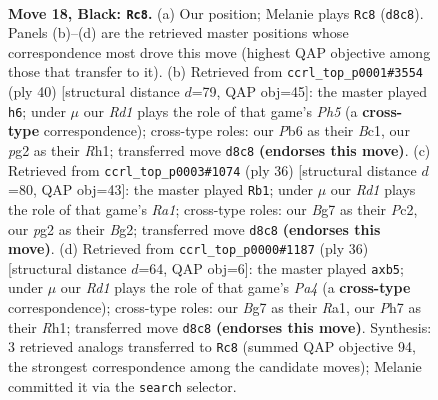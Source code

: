 \documentclass[11pt]{article}
\begin{document}
\begin{figure}[p]
\label{fig:thought-m33}
\end{figure}

\clearpage

\begin{figure}[p]\centering
\begin{subfigure}{0.46\textwidth}\centering
\resizebox{\linewidth}{!}{%
\newchessgame
\chessboard[
  setfen={rn1rn1k1/p4pbp/Pp2b3/1P2p2R/4P3/2N2N2/4BPP1/R1B1K3 b Q - 0 18},
  showmover=false,
  pgfstyle=straightmove, color=movearrow, markmove={d8-c8}
]}
\caption{}
\end{subfigure}\hfill
\begin{subfigure}{0.46\textwidth}\centering
\resizebox{\linewidth}{!}{%
\newchessgame
\chessboard[
  setfen={r2n2r1/p2kn3/1p3p2/1N1ppb1P/P7/5P2/1RP3P1/2B1KB1R w K - 1 21},
  showmover=false,
  pgfstyle=straightmove, color=movearrow, markmove={h5-h6}
]}
\caption{}
\end{subfigure}
\\[4pt]
\begin{subfigure}{0.46\textwidth}\centering
\resizebox{\linewidth}{!}{%
\newchessgame
\chessboard[
  setfen={2rnkbr1/1p3p1p/p3bp2/N3p3/P7/2P2RP1/2P2PBP/R1B3K1 w - - 4 19},
  showmover=false,
  pgfstyle=straightmove, color=movearrow, markmove={a1-b1}
]}
\caption{}
\end{subfigure}\hfill
\begin{subfigure}{0.46\textwidth}\centering
\resizebox{\linewidth}{!}{%
\newchessgame
\chessboard[
  setfen={rnb3k1/p2p2p1/1n2p2p/1p2p3/P3P2P/5rP1/1P2NB2/R3KB1R w KQ - 0 19},
  showmover=false,
  pgfstyle=straightmove, color=movearrow, markmove={a4-b5}
]}
\caption{}
\end{subfigure}
\caption{\textbf{Move 18, Black: \texttt{Rc8}.} (a) Our position; Melanie plays \texttt{Rc8} (\texttt{d8c8}). Panels (b)--(d) are the retrieved master positions whose correspondence most drove this move (highest QAP objective among those that transfer to it). (b) Retrieved from \texttt{ccrl\_top\_p0001\#3554} (ply 40) [structural distance $d$=79, QAP obj=45]: the master played \texttt{h6}; under $\mu$ our \emph{Rd1} plays the role of that game's \emph{Ph5} (a \textbf{cross-type} correspondence); cross-type roles: our \emph{P}b6 as their \emph{B}c1, our \emph{p}g2 as their \emph{R}h1; transferred move \texttt{d8c8} \textbf{(endorses this move)}. (c) Retrieved from \texttt{ccrl\_top\_p0003\#1074} (ply 36) [structural distance $d$=80, QAP obj=43]: the master played \texttt{Rb1}; under $\mu$ our \emph{Rd1} plays the role of that game's \emph{Ra1}; cross-type roles: our \emph{B}g7 as their \emph{P}c2, our \emph{p}g2 as their \emph{B}g2; transferred move \texttt{d8c8} \textbf{(endorses this move)}. (d) Retrieved from \texttt{ccrl\_top\_p0000\#1187} (ply 36) [structural distance $d$=64, QAP obj=6]: the master played \texttt{axb5}; under $\mu$ our \emph{Rd1} plays the role of that game's \emph{Pa4} (a \textbf{cross-type} correspondence); cross-type roles: our \emph{B}g7 as their \emph{R}a1, our \emph{P}h7 as their \emph{R}h1; transferred move \texttt{d8c8} \textbf{(endorses this move)}. Synthesis: 3 retrieved analogs transferred to \texttt{Rc8} (summed QAP objective 94, the strongest correspondence among the candidate moves); Melanie committed it via the \texttt{search} selector.}

\end{figure}
\end{document}
